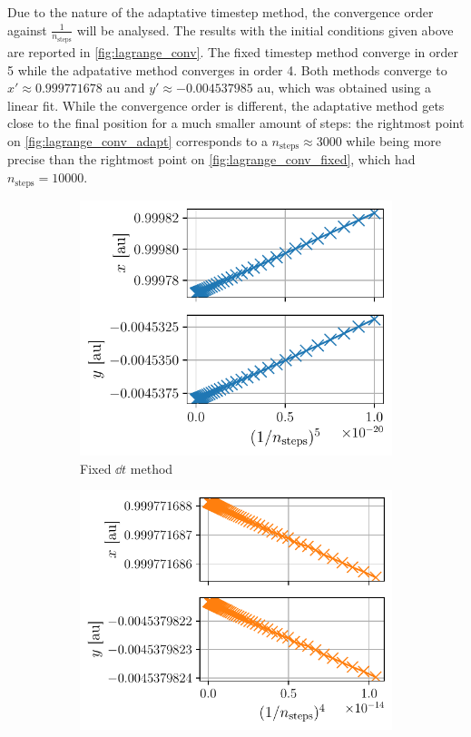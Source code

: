 Due to the nature of the adaptative timestep method, the convergence order against \(\frac{1}{n_\textrm{steps}}\) will be analysed. The results with the initial conditions given above are reported in \autoref{fig:lagrange_conv}. The fixed timestep method converge in order 5 while the adpatative method converges in order 4. Both methods converge to \(x' \approx 0.999771678\) au and \(y' \approx -0.004537985\) au, which was obtained using a linear fit. While the convergence order is different, the adaptative method gets close to the final position for a much smaller amount of steps: the rightmost point on \autoref{fig:lagrange_conv_adapt} corresponds to a \(n_\textrm{steps} \approx 3000\) while being more precise than the rightmost point on \autoref{fig:lagrange_conv_fixed}, which had \(n_\textrm{steps} = 10000\).
\begin{figure}[h]
    \centering
    \begin{subfigure}{0.45\linewidth}
        \centering
        \includegraphics[width=\linewidth]{figures/lagrange_convergence_fixed.pdf}
        \caption{Fixed \(\dd t\) method}
        \label{fig:lagrange_conv_fixed}
    \end{subfigure}
    \begin{subfigure}{0.49\linewidth}
        \centering
        \includegraphics[width=\linewidth]{figures/lagrange_convergence_adapt.pdf}

\end{subfigure}
\end{figure}
